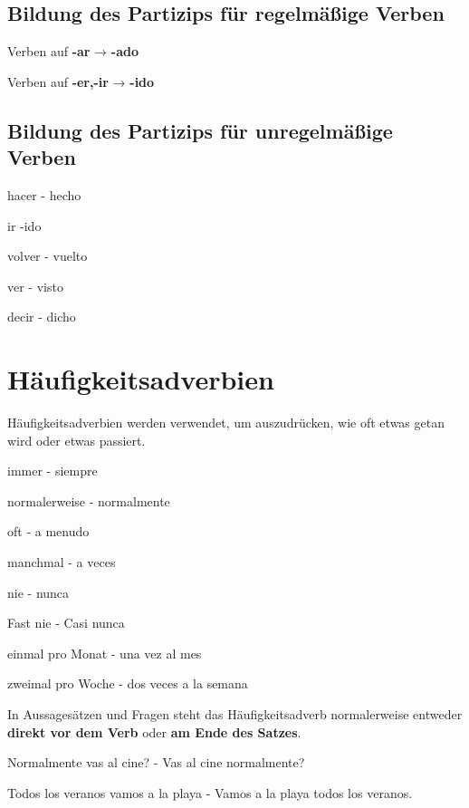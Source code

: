 \subsection*{Bildung des Partizips für regelmäßige Verben}
\begin{gramatica}
    \item Verben auf \textbf{-ar} → \textbf{-ado}
    \item Verben auf \textbf{-er,-ir} → \textbf{-ido}
\end{gramatica}
\subsection*{Bildung des Partizips für unregelmäßige Verben}
\begin{ejemplos}
    \item hacer - hecho
    \item ir -ido
    \item volver - vuelto
    \item ver - visto
    \item decir - dicho
\end{ejemplos}
\section{Häufigkeitsadverbien}
Häufigkeitsadverbien werden verwendet, um auszudrücken,
wie oft etwas getan wird oder etwas passiert.
\begin{ejemplos}
    \item immer - siempre
    \item normalerweise - normalmente
    \item oft - a menudo
    \item manchmal - a veces
    \item nie - nunca
    \item Fast nie - Casi nunca
    \item einmal pro Monat - una vez al mes
    \item zweimal pro Woche -  dos veces a la semana
\end{ejemplos}
In Aussagesätzen und Fragen steht das Häufigkeitsadverb 
normalerweise entweder \textbf{direkt vor dem Verb} oder 
\textbf{am Ende des Satzes}.
\begin{ejemplos}
    \item Normalmente vas al cine? - Vas al cine normalmente?
    \item Todos los veranos vamos a la playa - Vamos a la playa
    todos los veranos.
\end{ejemplos}
